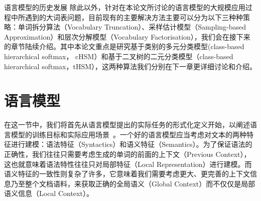 语言模型的历史发展
除此以外，针对在本论文所讨论的语言模型的大规模应用过程中所遇到的大词表问题，目前现有的主要解决方法主要可以分为以下三种种策略：单词拆分算法（Vocabulary Truncation）、采样估计模型（Sampling-based Approximation）和层次分解模型（Vocabulary Factorisation），我们会在接下来的章节陆续介绍。其中本论文重点是研究基于类别的多元分类模型(class-based hierarchical softmax， cHSM）和基于二叉树的二元分类模型（class-based hierarchical softmax，tHSM），这两种算法我们分别在下一章更详细讨论和介绍。

\section{语言模型}
在这一节中，我们将首先从语言模型提出的实际任务的形式化定义开始，以阐述语言模型的训练目标和实际应用场景~。一个好的语言模型应当考虑对文本的两种特征进行建模：语法特征（Syntactics）和语义特征（Semantics）。为了保证语法的正确性，我们往往只需要考虑生成的单词的前面的上下文（Previous Context），这也就意味着语法特性往往只对局部特征（Local Representation）进行建模。而语义特征的一致性则复杂了许多，它意味着我们需要考虑更大、更完善的上下文信息乃至整个文档语料，来获取正确的全局语义（Global Context）而不仅仅是局部语义信息（Local Context）。


